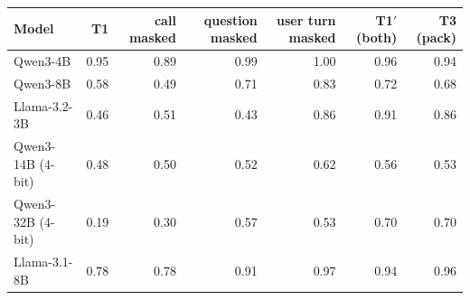 \begin{tabular}{lrrrrrr}
\toprule
Model & T1 & call masked & question masked & user turn masked & T1$'$ (both) & T3 (pack) \\
\midrule
Qwen3-4B & 0.95 & 0.89 & 0.99 & 1.00 & 0.96 & 0.94 \\
Qwen3-8B & 0.58 & 0.49 & 0.71 & 0.83 & 0.72 & 0.68 \\
Llama-3.2-3B & 0.46 & 0.51 & 0.43 & 0.86 & 0.91 & 0.86 \\
Qwen3-14B (4-bit) & 0.48 & 0.50 & 0.52 & 0.62 & 0.56 & 0.53 \\
Qwen3-32B (4-bit) & 0.19 & 0.30 & 0.57 & 0.53 & 0.70 & 0.70 \\
Llama-3.1-8B & 0.78 & 0.78 & 0.91 & 0.97 & 0.94 & 0.96 \\
\bottomrule
\end{tabular}
